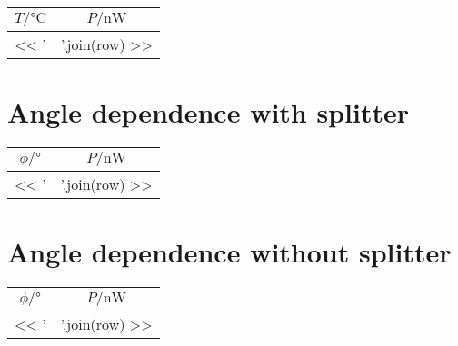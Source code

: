 \documentclass[11pt, english, fleqn, DIV=15, headinclude, BCOR=2cm]{scrreprt}
\begin{document}
\begin{appendix}
    \begin{longtable}[l]{SS}
        \toprule
        {$T/\si{\celsius}$}
        & {$P/\si{\nano\watt}$} \\
        \midrule
        \endhead
        << ' & '.join(row) >> \\
        \bottomrule
    \end{longtable}

    \section{Angle dependence with splitter}

    \begin{tabular}{SS}
        \toprule
        {$\phi/\si{\degree}$}
        & {$P/\si{\nano\watt}$} \\
        \midrule
        << ' & '.join(row) >> \\
        \bottomrule
    \end{tabular}

    \section{Angle dependence without splitter}

    \begin{tabular}{SS}
        \toprule
        {$\phi/\si{\degree}$}
        & {$P/\si{\nano\watt}$} \\
        \midrule
        << ' & '.join(row) >> \\
        \bottomrule
    \end{tabular}

\end{appendix}
\end{document}
